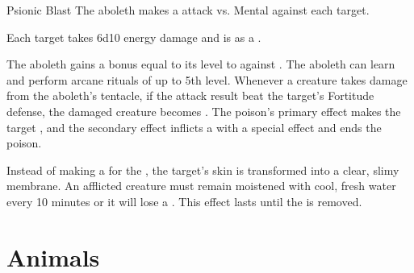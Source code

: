     \begin{freeability}{Psionic Blast}
      The aboleth makes a  attack
        vs. Mental against each target.
    
    \hit Each target takes 6d10 energy damage and is  as a .
    \end{freeability}
  
       The aboleth gains a bonus equal to its level to  against .
     The aboleth can learn and perform arcane rituals of up to 5th level.
        Whenever a creature takes damage from the aboleth's tentacle,
          if the attack result beat the target's Fortitude defense,
          the damaged creature becomes .
        The poison's primary effect makes the target ,
          and the secondary effect inflicts a  with a special effect and ends the poison.

        Instead of making a  for the ,
          the target's skin is transformed into a clear, slimy membrane.
        An afflicted creature must remain moistened with cool, fresh water every 10 minutes
          or it will lose a .
        This effect lasts until the  is removed.
  
        \section{Animals}
      

